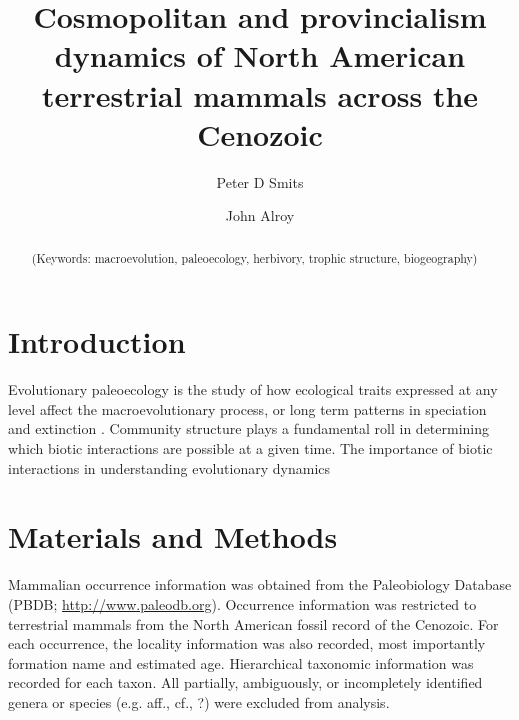 \documentclass[12pt,letterpaper]{article}
\title{Cosmopolitan and provincialism dynamics of North American terrestrial mammals across the Cenozoic}
\author[1]{Peter D Smits}
\author[2]{John Alroy}
\affil[1]{Committee on Evolutionary Biology, University of Chicago}
\affil[2]{Department of Biological Sciences, Macquarie University}
\begin{document}
\maketitle

\linenumbers
\modulolinenumbers[2]

\begin{abstract}
  \noindent (Keywords: macroevolution, paleoecology, herbivory, trophic structure, biogeography)
\end{abstract}

\section{Introduction}
Evolutionary paleoecology is the study of how ecological traits expressed at any level affect the macroevolutionary process, or long term patterns in speciation and extinction \citep{Kitchell1985a}. Community structure plays a fundamental roll in determining which biotic interactions are possible at a given time. The importance of biotic interactions in understanding evolutionary dynamics


\section{Materials and Methods}
Mammalian occurrence information was obtained from the Paleobiology Database (PBDB; \url{http://www.paleodb.org}). Occurrence information was restricted to terrestrial mammals from the North American fossil record of the Cenozoic. For each occurrence, the locality information was also recorded, most importantly formation name and estimated age. Hierarchical taxonomic information was recorded for each taxon. All partially, ambiguously, or incompletely identified genera or species (e.g. aff., cf., ?) were excluded from analysis. 
\end{document}
